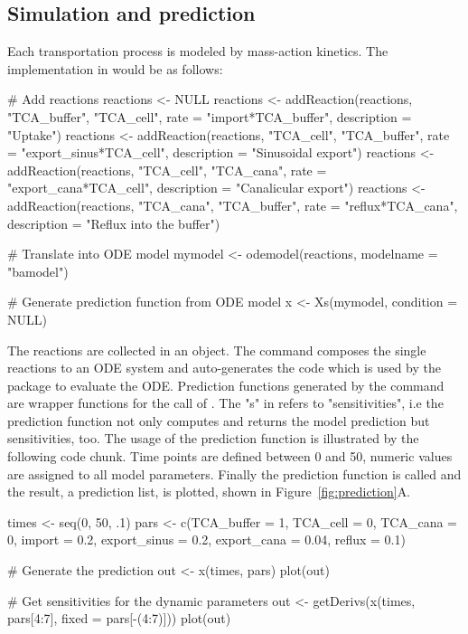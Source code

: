 \documentclass[article]{jss}
\begin{document}
\subsection{Simulation and prediction}

Each transportation process is modeled by mass-action kinetics. The implementation in  would be as follows:
\begin{CodeChunk}
	\begin{CodeInput}
# Add reactions
reactions <- NULL
reactions <- addReaction(reactions, "TCA_buffer", "TCA_cell",
			 rate = "import*TCA_buffer",
			 description = "Uptake")
reactions <- addReaction(reactions, "TCA_cell", "TCA_buffer",
			 rate = "export_sinus*TCA_cell",
			 description = "Sinusoidal export")
reactions <- addReaction(reactions, "TCA_cell", "TCA_cana",
			 rate = "export_cana*TCA_cell",
			 description = "Canalicular export")
reactions <- addReaction(reactions, "TCA_cana", "TCA_buffer",
			 rate = "reflux*TCA_cana",
			 description = "Reflux into the buffer")

# Translate into ODE model
mymodel <- odemodel(reactions, modelname = "bamodel")

# Generate prediction function from ODE model
x <- Xs(mymodel, condition = NULL)
	\end{CodeInput}
\end{CodeChunk}
The reactions are collected in an  object. The  command composes the single reactions to an ODE system and auto-generates the  code which is used by the  package to evaluate the ODE. Prediction functions generated by the  command are wrapper functions for the call of . The "s" in  refers to "sensitivities", i.e the prediction function not only computes and returns the model prediction but sensitivities, too. The usage of the prediction function is illustrated by the following code chunk. Time points are defined between 0 and 50, numeric values are assigned to all model parameters. Finally the prediction function is called and the result, a prediction list, is plotted, shown in Figure~\ref{fig:prediction}A.

\begin{CodeChunk}
\begin{CodeInput}
times <- seq(0, 50, .1)
pars <- c(TCA_buffer = 1,
          TCA_cell = 0,
	  TCA_cana = 0,
	  import = 0.2,
	  export_sinus = 0.2,
	  export_cana = 0.04,
	  reflux = 0.1)

# Generate the prediction
out <- x(times, pars)
plot(out)

# Get sensitivities for the dynamic parameters
out <- getDerivs(x(times, pars[4:7], fixed = pars[-(4:7)]))
plot(out)
\end{CodeInput}
\end{CodeChunk}
\end{document}

